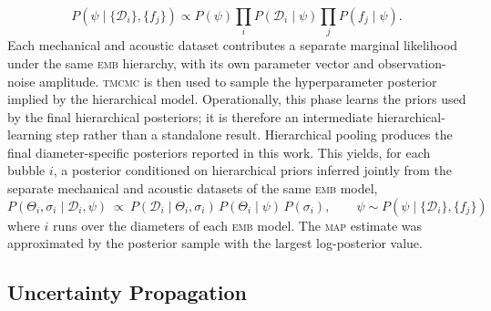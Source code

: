 \documentclass[%
 aip,
 jcp,
 amsmath,amssymb,
 preprint,%
]{revtex4-1}
\begin{document}
  \begin{equation}
  P(\psi \mid \{\mathcal{D}_i\},\{f_j\})
  \propto
  P(\psi)
  \prod_i P(\mathcal{D}_i\mid\psi)
  \prod_j P(f_j\mid\psi).
  \end{equation}
  Each mechanical and acoustic dataset contributes a separate marginal likelihood under the same \textsc{emb} hierarchy, with its own parameter vector and observation-noise amplitude. \textsc{tmcmc} is then used to sample the hyperparameter posterior implied by the hierarchical model.
  Operationally, this phase learns the priors used by the final hierarchical posteriors; it is therefore an intermediate hierarchical-learning step rather than a standalone result. Hierarchical pooling produces the final diameter-specific posteriors reported in this work. This yields, for each
  bubble $i$, a posterior conditioned on hierarchical priors inferred jointly from the separate mechanical and acoustic datasets of the same
  \textsc{emb} model,
  \begin{equation}
  P(\Theta_i,\sigma_i \mid \mathcal{D}_i, \psi) \ \propto\ P(\mathcal{D}_i \mid \Theta_i,\sigma_i )\,P(\Theta_i \mid \psi)\,P(\sigma_i), \qquad \psi
  \sim P(\psi \mid \{\mathcal{D}_i\},\{f_j\})
  \end{equation}
  where $i$ runs over the diameters of each \textsc{emb} model. The \textsc{map} estimate was approximated by the posterior sample with the largest
  log-posterior value.

\subsection{Uncertainty Propagation}
\label{sec:meth:propagation}
\end{document}
